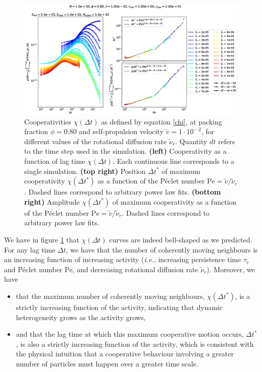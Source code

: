 \documentclass[class=report, float=false, crop=false]{standalone}
\begin{document}
\begin{figure}[h!]
\centering
\includegraphics[width=\textwidth]{figures/figs/intCuu_dt_Dk8000_Vj1000_Nq1000_Io5000_Mn1000_Cn5000_RMINl1000_RMAXm2000.eps}
\caption{Cooperativities $\chi(\Delta t)$ as defined by equation \ref{chi}, at packing fraction $\phi = 0.80$ and self-propulsion velocity $\tilde{v} = 1\cdot10^{—2}$, for different values of the rotational diffusion rate $\tilde{\nu}_r$. Quantity $dt$ refers to the time step used in the simulation. \textbf{(left)} Cooperativity as a function of lag time $\chi(\Delta t)$. Each continuous line corresponds to a single simulation. \textbf{(top right)} Position $\Delta t^*$ of maximum cooperativity $\chi(\Delta t^*)$ as a function of the P\'eclet number $\text{Pe} = \tilde{v}/\tilde{\nu}_r$. Dashed lines correspond to arbitrary power law fits. \textbf{(bottom right)} Amplitude $\chi(\Delta t^*)$ of maximum cooperativity as a function of the P\'eclet number $\text{Pe} = \tilde{v}/\tilde{\nu}_r$. Dashed lines correspond to arbitrary power law fits.}
\label{chi_dr_dt}
\end{figure}

We have in figure \ref{chi_dr_dt} that $\chi(\Delta t)$ curves are indeed bell-shaped as we predicted.\\

For any lag time $\Delta t$, we have that the number of coherently moving neighbours is an increasing function of increasing activity (\textit{i.e.}, increasing persistence time $\tau_r$ and P\'eclet number $\text{Pe}$, and decreasing rotational diffusion rate $\tilde{\nu}_r$). Moreover, we have
\begin{itemize}
  \item that the maximum number of coherently moving neighbours, $\chi(\Delta t^*)$, is a strictly increasing function of the activity, indicating that dynamic heterogeneity grows as the activity grows,
  \item and that the lag time at which this maximum cooperative motion occurs, $\Delta t^*$, is also a strictly increasing function of the activity, which is consistent with the physical intuition that a cooperative behaviour involving a greater number of particles must happen over a greater time scale.\\
\end{itemize}
\end{document}
